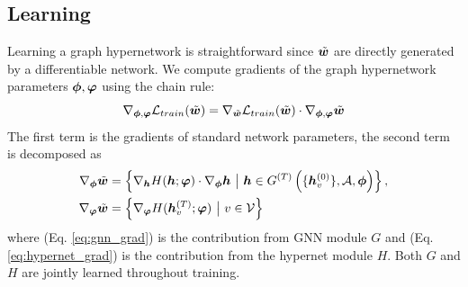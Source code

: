 \subsection{Learning}
Learning a graph hypernetwork is straightforward since $\tilde{{\bm{w}}}$ are directly generated by a
differentiable network. We compute gradients of the graph hypernetwork parameters ${\bm{\phi}}, {\bm{\varphi}}$
using the chain rule:
\begin{equation}
\nabla_{{\bm{\phi}}, {\bm{\varphi}}}{{\mathcal{L}}_{train}(\tilde{{\bm{w}}})} = \nabla_{\tilde{{\bm{w}}}}{
{\mathcal{L}}_{train}(\tilde{{\bm{w}}})} \cdot \nabla_{{\bm{\phi}}, {\bm{\varphi}}}{\tilde{{\bm{w}}}}
\end{equation}
The first term is the gradients of standard network parameters, the second term is decomposed as\begin{align}
 \nabla_{\bm{\phi}}{\tilde{{\bm{w}}}} &= \left\{ \nabla_{\bm{h}} H( {\bm{h}}; {\bm{\varphi}}) \cdot \nabla_{\bm{\phi}} {\bm{h}} \ \big| \ {\bm{h}} \in G^{(T)} \left( \{{\bm{h}}_v^{(0)}\}, {\mathcal{A}}, {\bm{\phi}} \right) \right\}, \label{eq:gnn_grad}  \\ 
 \nabla_{\bm{\varphi}}{\tilde{{\bm{w}}}} &= \left\{ \nabla_{\bm{\varphi}} H( {\bm{h}}_v^{(T)}; {\bm{\varphi}}) \ \big| \ v \in {\mathcal{V}} \right\} \label{eq:hypernet_grad}
\end{align}
where (Eq. \ref{eq:gnn_grad}) is the contribution from GNN module $G$ and (Eq.
\ref{eq:hypernet_grad}) is the contribution from the hypernet module $H$. Both $G$ and $H$ are
jointly learned throughout training.
